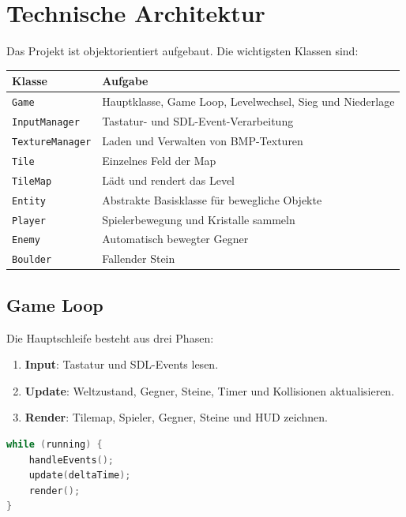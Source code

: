 \documentclass[12pt,a4paper]{article}
\begin{document}
\section{Technische Architektur}

Das Projekt ist objektorientiert aufgebaut. Die wichtigsten Klassen sind:

\begin{longtable}{|p{4cm}|p{10cm}|}
\hline
\textbf{Klasse} & \textbf{Aufgabe} \\
\hline
\texttt{Game} & Hauptklasse, Game Loop, Levelwechsel, Sieg und Niederlage \\
\hline
\texttt{InputManager} & Tastatur- und SDL-Event-Verarbeitung \\
\hline
\texttt{TextureManager} & Laden und Verwalten von BMP-Texturen \\
\hline
\texttt{Tile} & Einzelnes Feld der Map \\
\hline
\texttt{TileMap} & Lädt und rendert das Level \\
\hline
\texttt{Entity} & Abstrakte Basisklasse für bewegliche Objekte \\
\hline
\texttt{Player} & Spielerbewegung und Kristalle sammeln \\
\hline
\texttt{Enemy} & Automatisch bewegter Gegner \\
\hline
\texttt{Boulder} & Fallender Stein \\
\hline
\end{longtable}

\subsection{Game Loop}

Die Hauptschleife besteht aus drei Phasen:

\begin{enumerate}
    \item \textbf{Input}: Tastatur und SDL-Events lesen.
    \item \textbf{Update}: Weltzustand, Gegner, Steine, Timer und Kollisionen aktualisieren.
    \item \textbf{Render}: Tilemap, Spieler, Gegner, Steine und HUD zeichnen.
\end{enumerate}

\begin{lstlisting}[language=C++]
while (running) {
    handleEvents();
    update(deltaTime);
    render();
}
\end{lstlisting}
\end{document}
